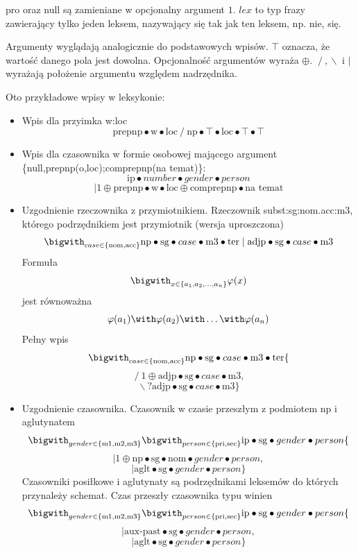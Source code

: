 \documentclass[oneside,pwrcover,withmarginpar,hidelinks,11pt]{article}
\newcommand{\tensor}{\bullet}
\newcommand{\forward}{\operatorname{/}}
\newcommand{\backward}{\operatorname{\backslash}}
\newcommand{\both}{\mid}
\newcommand{\plus}{\oplus}
\newcommand{\maybe}{?}
\newcommand{\one}{1}
\begin{document}
pro oraz null są zamieniane w opcjonalny argument $\one$.
$lex$ to typ frazy zawierający tylko jeden leksem, nazywający się tak jak ten leksem, np. nie, się.

Argumenty wyglądają analogicznie do podstawowych wpisów.
$\top$ oznacza, że wartość danego pola jest dowolna.
Opcjonalność argumentów wyraża $\plus$.
$\forward, \backward$ i $\both$ wyrażają położenie argumentu względem nadrzędnika.

Oto przykładowe wpisy w leksykonie:
\begin{itemize}
\item Wpis dla przyimka w:loc
\[\text{prepnp}\tensor\text{w}\tensor\text{loc}\forward
\text{np}\tensor\top\tensor\text{loc}\tensor\top\tensor\top\]
\item Wpis dla czasownika w formie osobowej mającego argument \{null,prepnp(o,loc);comprepnp(na temat)\}:
\[\text{ip}\tensor number\tensor gender\tensor person\]\[\both\one\plus
\text{prepnp}\tensor\text{w}\tensor\text{loc}\plus
\text{comprepnp}\tensor\text{na temat}\]
\item Uzgodnienie rzeczownika z przymiotnikiem.
Rzeczownik subst:sg:nom.acc:m3, \\ którego podrzędnikiem jest przymiotnik (wersja uproszczona)
\[\bigwith_{case\in\{\text{nom},\text{acc}\}}\text{np}\tensor\text{sg}\tensor case\tensor\text{m3}\tensor\text{ter}\both
 \text{adjp}\tensor\text{sg}\tensor case\tensor\text{m3}
\]
Formuła
\[\bigwith_{x\in \{a_1,a_2,\dots,a_n\}}\varphi(x)\]
jest równoważna 
\[\varphi(a_1)\with\varphi(a_2)\with\dots\with\varphi(a_n)\]
Pełny wpis
\[\bigwith_{case\in\{\text{nom},\text{acc}\}}\text{np}\tensor\text{sg}\tensor case\tensor\text{m3}\tensor\text{ter}\{\]
\[\forward \one\plus\text{adjp}\tensor\text{sg}\tensor case\tensor\text{m3},\]
\[\backward\maybe\text{adjp}\tensor\text{sg}\tensor case\tensor\text{m3}\}\]


\item Uzgodnienie czasownika.
Czasownik w czasie przeszłym z podmiotem np i aglutynatem
\[\bigwith_{gender\in\{\text{m1},\text{m2},\text{m3}\}}\bigwith_{person\in\{\text{pri},\text{sec}\}}
\text{ip}\tensor\text{sg}\tensor gender\tensor person\{\]
\[\both\one\plus\text{np}\tensor\text{sg}\tensor\text{nom}\tensor gender\tensor person,\]
\[\both\text{aglt}\tensor\text{sg}\tensor gender\tensor person\}\]
Czasowniki posiłkowe i aglutynaty są podrzędnikami leksemów do których przynależy schemat. 
Czas przeszły czasownika typu winien
\[\bigwith_{gender\in\{\text{m1},\text{m2},\text{m3}\}}\bigwith_{person\in\{\text{pri},\text{sec}\}}
\text{ip}\tensor\text{sg}\tensor gender\tensor person\{\]
\[\both\text{aux-past}\tensor\text{sg}\tensor gender\tensor person,\]
\[\both\text{aglt}\tensor\text{sg}\tensor gender\tensor person\}\]


\end{itemize}
\end{document}
